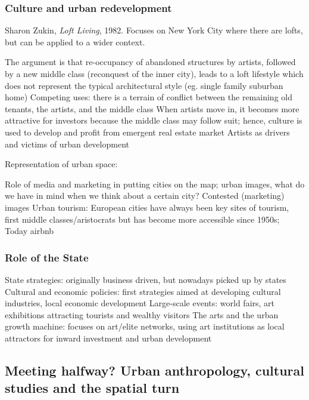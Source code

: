 \documentclass{article}
\begin{document}
\subsubsection{Culture and urban redevelopment}

Sharon Zukin, \textit{Loft Living}, 1982. Focuses on New York City where there are lofts, but can be applied to a wider context.

\begin{outline}
	\1 The argument is that re-occupancy of abandoned structures by artists, followed by a new middle class (reconquest of the inner city), leads to a loft lifestyle which does not represent the typical architectural style (eg. single family suburban home)
	\1 Competing uses: there is a terrain of conflict between the remaining old tenants, the artists, and the middle class
	\1 When artists move in, it becomes more attractive for investors because the middle class may follow suit; hence, culture is used to develop and profit from emergent real estate market
	\1 Artists as drivers and victims of urban development
\end{outline}

Representation of urban space:

\begin{outline}
	\1 Role of media and marketing in putting cities on the map; urban images, what do we have in mind when we think about a certain city?
	\1 Contested (marketing) images
	\1 Urban tourism: European cities have always been key sites of tourism, first middle classes/aristocrats but has become more accessible since 1950s; Today airbnb

\subsubsection{Role of the State}

	\1 State strategies: originally business driven, but nowadays picked up by states
		\2 Cultural and economic policies: first strategies aimed at developing cultural industries, local economic development
		\2 Large-scale events: world fairs, art exhibitions attracting tourists and wealthy visitors
		\2 The arts and the urban growth machine: focuses on art/elite networks, using art institutions as local attractors for inward investment and urban development
\end{outline}

\subsection{Meeting halfway? Urban anthropology, cultural studies and the spatial turn}
\end{document}
